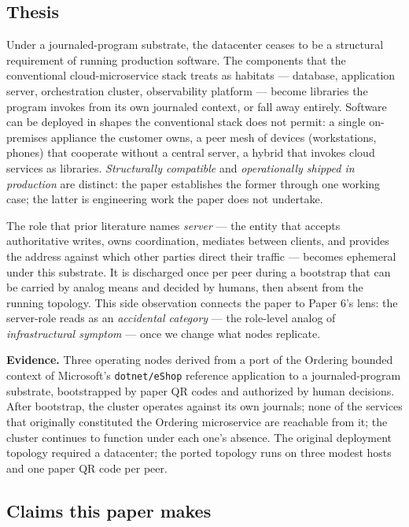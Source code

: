 \documentclass[
]{article}
\newcounter{none} %
\begin{document}
\subsection{Thesis}\label{thesis}

Under a journaled-program substrate, the datacenter ceases to be a
structural requirement of running production software. The components
that the conventional cloud-microservice stack treats as habitats ---
database, application server, orchestration cluster, observability
platform --- become libraries the program invokes from its own journaled
context, or fall away entirely. Software can be deployed in shapes the
conventional stack does not permit: a single on-premises appliance the
customer owns, a peer mesh of devices (workstations, phones) that
cooperate without a central server, a hybrid that invokes cloud services
as libraries. \emph{Structurally compatible} and \emph{operationally
shipped in production} are distinct: the paper establishes the former
through one working case; the latter is engineering work the paper does
not undertake.

The role that prior literature names \emph{server} --- the entity that
accepts authoritative writes, owns coordination, mediates between
clients, and provides the address against which other parties direct
their traffic --- becomes ephemeral under this substrate. It is
discharged once per peer during a bootstrap that can be carried by
analog means and decided by humans, then absent from the running
topology. This side observation connects the paper to Paper 6's lens:
the server-role reads as an \emph{accidental category} --- the
role-level analog of \emph{infrastructural symptom} --- once we change
what nodes replicate.

\textbf{Evidence.} Three operating nodes derived from a port of the
Ordering bounded context of Microsoft's \texttt{dotnet/eShop} reference
application to a journaled-program substrate, bootstrapped by paper QR
codes and authorized by human decisions. After bootstrap, the cluster
operates against its own journals; none of the services that originally
constituted the Ordering microservice are reachable from it; the cluster
continues to function under each one's absence. The original deployment
topology required a datacenter; the ported topology runs on three modest
hosts and one paper QR code per peer.

\subsection{Claims this paper makes}\label{claims-this-paper-makes}
\end{document}

